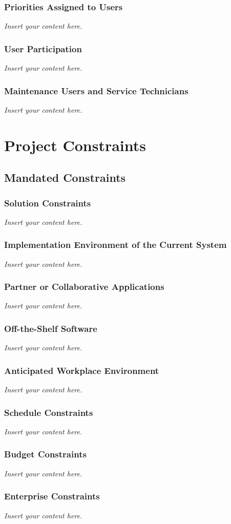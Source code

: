 \documentclass[12pt]{article}
\newcommand{\lips}{\textit{Insert your content here.}}
\begin{document}
\subsubsection{Priorities Assigned to Users}
\lips
\subsubsection{User Participation}
\lips
\subsubsection{Maintenance Users and Service Technicians}
\lips

\section{Project Constraints}
\subsection{Mandated Constraints}
\subsubsection{Solution Constraints}
\lips
\subsubsection{Implementation Environment of the Current System}
\lips
\subsubsection{Partner or Collaborative Applications}
\lips
\subsubsection{Off-the-Shelf Software}
\lips
\subsubsection{Anticipated Workplace Environment}
\lips
\subsubsection{Schedule Constraints}
\lips
\subsubsection{Budget Constraints}
\lips
\subsubsection{Enterprise Constraints}
\lips
\end{document}
